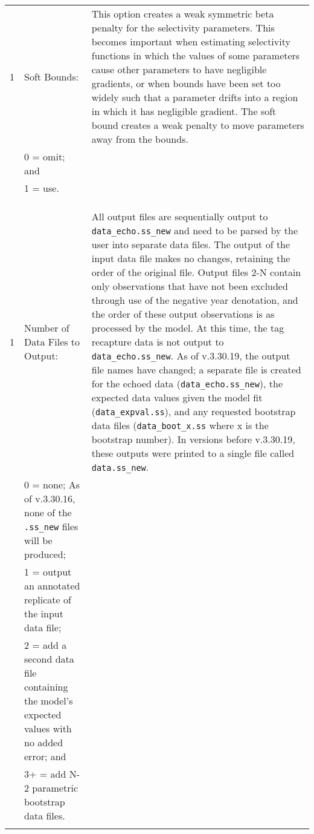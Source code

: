 {\begin{landscape}
\begin{longtable}{p{1.5cm} p{7.2cm} p{12.3cm}}
 \hline
 1 & Soft Bounds: & \multirow{1}{1cm}[-0.25cm]{\parbox{12.5cm}{This option creates a weak symmetric beta penalty for the selectivity parameters. This becomes important when estimating selectivity functions in which the values of some parameters cause other parameters to have negligible gradients, or when bounds have been set too widely such that a parameter drifts into a region in which it has negligible gradient. The soft bound creates a weak penalty to move parameters away from the bounds.}}\Tstrut\Bstrut\\
   & 0 = omit; and & \\
   & 1 = use. & \\
   & & \\
   & & \\
   & & \\

 \pagebreak
 1 & Number of Data Files to Output: & \multirow{1}{1cm}[-0.25cm]{\parbox{12.5cm}{All output files are sequentially output to \texttt{data\_echo.ss\_new} and need to be parsed by the user into separate data files. The output of the input data file makes no changes, retaining the order of the original file. Output files 2-N contain only observations that have not been excluded through use of the negative year denotation, and the order of these output observations is as processed by the model. At this time, the tag recapture data is not output to \texttt{data\_echo.ss\_new}. As of v.3.30.19, the output file names have changed; a separate file is created for the echoed data (\texttt{data\_echo.ss\_new}), the expected data values given the model fit (\texttt{data\_expval.ss}), and any requested bootstrap data files (\texttt{data\_boot\_x.ss} where x is the bootstrap number). In versions before v.3.30.19, these outputs were printed to a single file called \texttt{data.ss\_new}.}} \Tstrut\Bstrut\\
   & 0 = none; As of v.3.30.16, none of the \texttt{.ss\_new} files will be produced; & \Bstrut\\
   & 1 = output an annotated replicate of the input data file; & \Tstrut\Bstrut\\
   & 2 = add a second data file containing the model's expected values with no added error; and & \Tstrut\Bstrut\\
   & 3+ = add N-2 parametric bootstrap data files. & \Tstrut\\
   & & \\


\end{longtable}
\end{landscape}}
